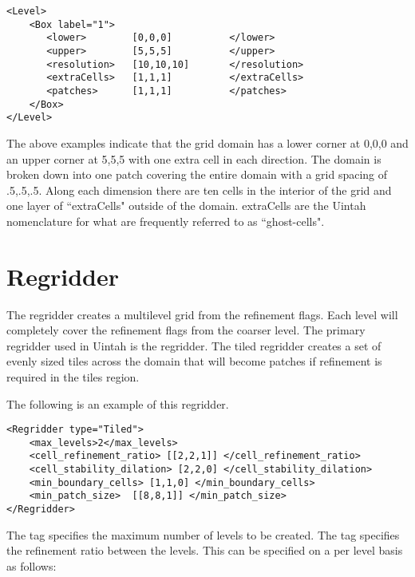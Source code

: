 \begin{Verbatim}[fontsize=\footnotesize]
<Level>
    <Box label="1">
       <lower>        [0,0,0]          </lower>
       <upper>        [5,5,5]          </upper>
       <resolution>   [10,10,10]       </resolution>
       <extraCells>   [1,1,1]          </extraCells>
       <patches>      [1,1,1]          </patches>
    </Box>
</Level>
\end{Verbatim}


The above examples indicate that the grid domain has a lower corner at
0,0,0 and an upper corner at 5,5,5 with one extra cell in each
direction.  The domain is broken down into one patch covering the
entire domain with a grid spacing of .5,.5,.5.  Along each dimension
there are ten cells in the interior of the grid and one layer of
``extraCells" outside of the domain.  extraCells are the Uintah nomenclature
for what are frequently referred to as ``ghost-cells".

%
%
\section{Regridder}

The regridder creates a multilevel grid from the refinement flags.
Each level will completely cover the refinement flags from the coarser
level.  The primary regridder used in Uintah is the  regridder.
The tiled regridder creates a set of evenly sized tiles across the domain
that will become patches if refinement is required in the tiles region.

The following is an example of this regridder.

\begin{Verbatim}[fontsize=\footnotesize]
<Regridder type="Tiled">   
    <max_levels>2</max_levels>
    <cell_refinement_ratio> [[2,2,1]] </cell_refinement_ratio>
    <cell_stability_dilation> [2,2,0] </cell_stability_dilation>
    <min_boundary_cells> [1,1,0] </min_boundary_cells>
    <min_patch_size>  [[8,8,1]] </min_patch_size>
</Regridder>
\end{Verbatim}

The  tag specifies the maximum number of levels
to be created.  The  tag specifies the 
refinement ratio between the levels.  This can be specified on a per 
level basis as follows:

